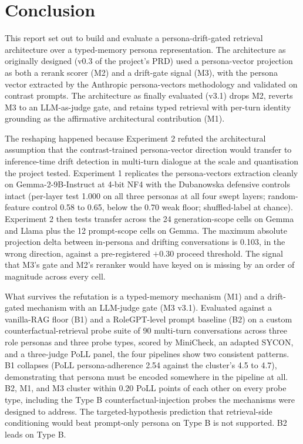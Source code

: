 \chapter{Conclusion}
\label{ch:conclusion}

This report set out to build and evaluate a persona-drift-gated retrieval architecture over a typed-memory persona representation. The architecture as originally designed (v0.3 of the project's PRD) used a persona-vector projection as both a rerank scorer (M2) and a drift-gate signal (M3), with the persona vector extracted by the Anthropic persona-vectors methodology and validated on contrast prompts. The architecture as finally evaluated (v3.1) drops M2, reverts M3 to an LLM-as-judge gate, and retains typed retrieval with per-turn identity grounding as the affirmative architectural contribution (M1).

The reshaping happened because Experiment 2 refuted the architectural assumption that the contrast-trained persona-vector direction would transfer to inference-time drift detection in multi-turn dialogue at the scale and quantisation the project tested. Experiment 1 replicates the persona-vectors extraction cleanly on Gemma-2-9B-Instruct at 4-bit NF4 with the Dubanowska defensive controls intact (per-layer test \auroc{} 1.000 on all three personas at all four swept layers; random-feature control 0.58 to 0.65, below the 0.70 weak floor; shuffled-label at chance). Experiment 2 then tests transfer across the 24 generation-scope cells on Gemma and Llama plus the 12 prompt-scope cells on Gemma. The maximum absolute projection delta between in-persona and drifting conversations is 0.103, in the wrong direction, against a pre-registered $+0.30$ proceed threshold. The signal that M3's gate and M2's reranker would have keyed on is missing by an order of magnitude across every cell.

What survives the refutation is a typed-memory mechanism (M1) and a drift-gated mechanism with an LLM-judge gate (M3 v3.1). Evaluated against a vanilla-RAG floor (B1) and a RoleGPT-level prompt baseline (B2) on a custom counterfactual-retrieval probe suite of 90 multi-turn conversations across three role personas and three probe types, scored by MiniCheck, an adapted SYCON, and a three-judge PoLL panel, the four pipelines show two consistent patterns. B1 collapses (PoLL persona-adherence 2.54 against the cluster's 4.5 to 4.7), demonstrating that persona must be encoded somewhere in the pipeline at all. B2, M1, and M3 cluster within 0.20 PoLL points of each other on every probe type, including the Type B counterfactual-injection probes the mechanisms were designed to address. The targeted-hypothesis prediction that retrieval-side conditioning would beat prompt-only persona on Type B is not supported. B2 leads on Type B.

